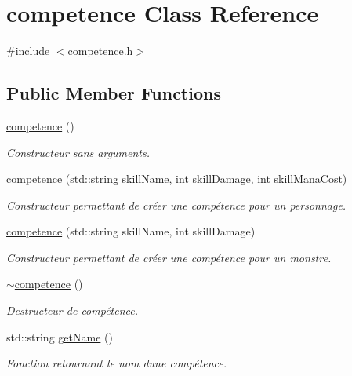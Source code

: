 \hypertarget{classcompetence}{}\section{competence Class Reference}
\label{classcompetence}


{\ttfamily \#include $<$competence.\+h$>$}

\subsection*{Public Member Functions}
\begin{DoxyCompactItemize}
\item 
\hyperlink{classcompetence_ae47bad4331015d873fef6b006b987d38}{competence} ()
\begin{DoxyCompactList}\small\item\em Constructeur sans arguments. \end{DoxyCompactList}\item 
\hyperlink{classcompetence_ae214635d91c8b1c5a37352dccbcd2397}{competence} (std\+::string skill\+Name, int skill\+Damage, int skill\+Mana\+Cost)
\begin{DoxyCompactList}\small\item\em Constructeur permettant de créer une compétence pour un personnage. \end{DoxyCompactList}\item 
\hyperlink{classcompetence_a269947808c5e8662ecabb11e96a4d9c0}{competence} (std\+::string skill\+Name, int skill\+Damage)
\begin{DoxyCompactList}\small\item\em Constructeur permettant de créer une compétence pour un monstre. \end{DoxyCompactList}\item 
\hyperlink{classcompetence_a158b19a476ae306eeaaa6672aab62e6c}{$\sim$competence} ()
\begin{DoxyCompactList}\small\item\em Destructeur de compétence. \end{DoxyCompactList}\item 
std\+::string \hyperlink{classcompetence_abbb996751e239fc151caae2a73947710}{get\+Name} ()
\begin{DoxyCompactList}\small\item\em Fonction retournant le nom d\textquotesingle{}une compétence. \end{DoxyCompactList}\item 

\end{DoxyCompactItemize}

